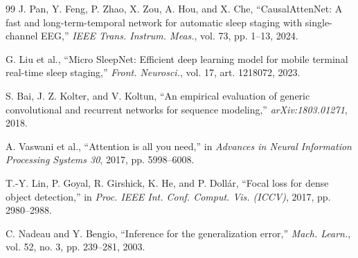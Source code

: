 \documentclass[conference]{IEEEtran}
\begin{document}
\begin{thebibliography}{99}
 J. Pan, Y. Feng, P. Zhao, X. Zou, A. Hou, and X. Che, ``CausalAttenNet: A
fast and long-term-temporal network for automatic sleep staging with single-channel EEG,''
\emph{IEEE Trans. Instrum. Meas.}, vol. 73, pp. 1--13, 2024.

 G. Liu et al., ``Micro SleepNet: Efficient deep learning model for mobile
terminal real-time sleep staging,'' \emph{Front. Neurosci.}, vol. 17, art. 1218072, 2023.

 S. Bai, J. Z. Kolter, and V. Koltun, ``An empirical evaluation of generic
convolutional and recurrent networks for sequence modeling,'' \emph{arXiv:1803.01271}, 2018.

 A. Vaswani et al., ``Attention is all you need,'' in \emph{Advances in Neural
Information Processing Systems 30}, 2017, pp. 5998--6008.

 T.-Y. Lin, P. Goyal, R. Girshick, K. He, and P. Doll\'ar, ``Focal loss for dense
object detection,'' in \emph{Proc. IEEE Int. Conf. Comput. Vis. (ICCV)}, 2017, pp. 2980--2988.

 C. Nadeau and Y. Bengio, ``Inference for the generalization error,'' \emph{Mach.
Learn.}, vol. 52, no. 3, pp. 239--281, 2003.

\end{thebibliography}
\end{document}
